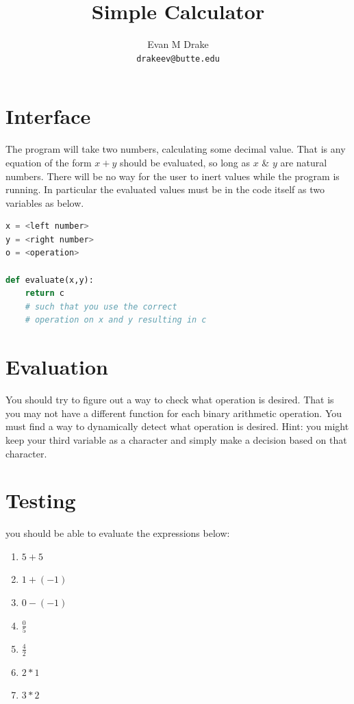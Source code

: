 \documentclass[12pt]{article}
\title{Simple Calculator}
\author{
	Evan M Drake \\
	\texttt{drakeev@butte.edu}
}
\begin{document}
	\maketitle
	\tableofcontents

	\newpage

	\section{Interface}
		\indent The program will take two numbers, calculating some decimal value.
		That is any equation of the form $x + y$ should be evaluated,
			so long as $x$ \& $y$ are natural numbers.
		There will be no way for the user to inert values while the program is running.
		In particular the evaluated values must be in the code itself as two variables as below.

		\begin{lstlisting}[style=pseudocode, language=Python]
x = <left number>
y = <right number>
o = <operation>

def evaluate(x,y):
	return c
	# such that you use the correct
	# operation on x and y resulting in c
		\end{lstlisting}

	\section{Evaluation}
		\indent You should try to figure out a way to check what operation is desired.
		That is you may not have a different function for each binary arithmetic operation.
		You must find a way to dynamically detect what operation is desired.
		Hint: you might keep your third variable as a character and simply make a decision based on that character.
	
	\section{Testing}
		\indent you should be able to evaluate the expressions below:
		\begin{enumerate}
			\item $5 + 5$
			\item $1 + (-1)$
			\item $0 - (-1)$
			\item $\frac{0}{5}$
			\item $\frac{4}{2}$
			\item $2 * 1$
			\item $3 * 2$
		\end{enumerate}


	\nocite{*}

	\newpage %
	\backmatter
	\printbibliography

	\newpage %
	\printindex

	\newpage %
	\appendix
\end{document}
